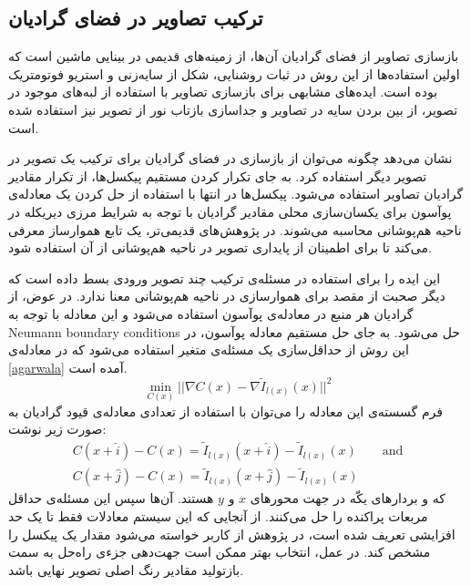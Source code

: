 \subsection{ترکیب تصاویر در فضای گرادیان}
بازسازی تصاویر از فضای گرادیان آن‌ها، از زمینه‌های قدیمی در بینایی ماشین است\cite{HornRV} که اولین استفاده‌ها از این روش در ثبات روشنایی\cite{Horn1974DeterminingLF}، شکل از سایه‌زنی\cite{shapeFromShading} و استریو فوتومتریک\cite{Woodham1994GradientAC} بوده است. ایده‌های مشابهی برای بازسازی تصاویر با استفاده از لبه‌های موجود در تصویر\cite{elderGoldberg}، از بین بردن سایه در تصاویر\cite{weissShadow} و جداسازی بازتاب نور از تصویر\cite{levinReflect1}\cite{levinReflect2} نیز استفاده شده است.

\cite{PoissonImageEditing}
 نشان می‌دهد چگونه می‌توان از بازسازی در فضای گرادیان برای ترکیب یک تصویر در تصویر دیگر استفاده کرد. به جای تکرار کردن مستقیم پیکسل‌ها، از تکرار مقادیر گرادیان تصاویر استفاده می‌شود. پیکسل‌ها در انتها با استفاده از حل کردن یک معادله‌ی پوآسون برای یکسان‌سازی محلی مقادیر گرادیان با توجه به شرایط مرزی دیریکله در ناحیه هم‌پوشانی محاسبه می‌شوند. در پژوهش‌های قدیمی‌تر، \cite{Peleg1981EliminationOS} یک تابع هموارساز معرفی می‌کند تا برای اطمینان از پایداری تصویر در ناحیه هم‌پوشانی از آن استفاده شود.

\cite{agarwala2004}
 این ایده را برای استفاده در مسئله‌ی ترکیب چند تصویر ورودی بسط داده است که دیگر صحبت از مقصد برای هموارسازی در ناحیه هم‌پوشانی معنا ندارد. در عوض، از گرادیان هر منبع در معادله‌ی پوآسون استفاده می‌شود و این معادله با توجه به \gls{Neumann boundary conditions} حل می‌شود. به جای حل مستقیم معادله پو‌آسون، در این روش از حداقل‌سازی یک مسئله‌ی متغیر استفاده می‌شود که در معادله‌ی \ref{agarwala} آمده است.
\begin{equation} \label{agarwala}
	\min_{C(x)} ||\nabla C(x) - \nabla \tilde{I}_{l(x)}(x)||^2
\end{equation} 
فرم گسسته‌ی این معادله را می‌توان با استفاده از تعدادی معادله‌ی قیود گرادیان به صورت زیر نوشت:
\begin{gather}
	C(x+\hat{i}) - C(x) = \tilde{I}_{l(x)}(x+\hat{i}) - \tilde{I}_{l(x)}(x) \qquad \textrm{and}\\
	C(x+\hat{j}) - C(x) = \tilde{I}_{l(x)}(x+\hat{j}) - \tilde{I}_{l(x)}(x) \qquad \quad
\end{gather}
که 
و 
بردارهای یکّه در جهت محور‌های $x$ و $y$ هستند. آن‌ها سپس این مسئله‌ی حداقل مربعات پراکنده را حل می‌کنند. از آنجایی که این سیستم معادلات فقط تا یک حد افزایشی تعریف شده است، در پژوهش از کاربر خواسته می‌شود مقدار یک پیکسل را مشخص کند. در عمل، انتخاب بهتر ممکن است جهت‌دهی جزءی راه‌حل به سمت بازتولید مقادیر رنگ اصلی تصویر نهایی باشد.

